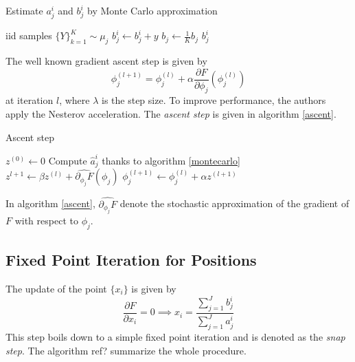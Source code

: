 \begin{algorithm}[H]
    \caption{Estimate $a_j^i$ and $b_j^i$ by Monte Carlo approximation}\label{montecarlo}
    \begin{algorithmic}[1] %
        \REQUIRE iid samples $\lbrace Y\rbrace_{k=1}^K \sim \mu_j$ 
                \STATE $b_j^i \gets b_j^i + y$
            \ENDIF 
        \ENDFOR
        \STATE $b_j \gets \frac{1}{K} b_j$
        \RETURN $b_j^i$
    \end{algorithmic}
\end{algorithm}

The well known gradient ascent step is given by $$ \phi_j^{(l+1)} = \phi_j^{(l)} + \alpha \frac{\partial F}{\partial \phi_j}(\phi_j^{(l)}) $$
at iteration $l$, where $\lambda$ is the step size. To improve performance, the authors apply the Nesterov acceleration. The \textit{ascent step} is given in algorithm \ref{ascent}.

\begin{algorithm}[H]
    \caption{Ascent step}\label{ascent}
    \begin{algorithmic}[1]
        \STATE $z^{(0)} \gets 0$
        \STATE Compute $\hat{a}_j^i$ thanks to algorithm \ref{montecarlo}
        \STATE $z^{l+1} \gets \beta z^{(l)} + \widehat{\partial_{\phi_j}F}(\phi_j)$ 
        \STATE $\phi_j^{(l+1)} \gets \phi_j^{(l)} + \alpha z^{(l+1)}$
        \ENDWHILE
        \ENDFOR
    \end{algorithmic}
\end{algorithm}
In algorithm \ref{ascent}, $\widehat{\partial_{\phi_j}F}$ denote the stochastic approximation of the gradient of $F$ with respect to $\phi_j$. 

\subsection{Fixed Point Iteration for Positions}

The update of the point $\lbrace x_i \rbrace$ is given by 
$$
\frac{\partial F}{\partial x_i} = 0 \implies x_i = \frac{\sum_{j=1}^J b_j^i }{\sum_{j=1}^{J}a_j^i}
$$
This step boils down to a simple fixed point iteration and is denoted as the \textit{snap step}.
The algorithm ref{?} summarize the whole procedure. 


